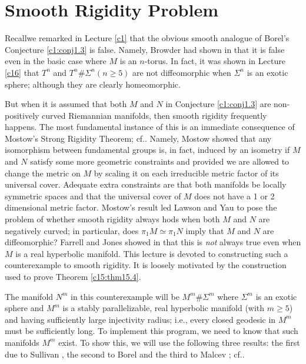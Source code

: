 \chapter{Smooth Rigidity Problem}\label{c17}

Recall\pageoriginale we remarked in Lecture \ref{c1} that the obvious
smooth analogue of Borel's Conjecture \ref{c1:conj1.3} is false. Namely, Browder
had shown in \cite{13} that it is false even in the basic case where
$M$ is an $n$-torus. In fact, it was shown in Lecture \ref{c16} that
$T^{n}$ and $T^{n}\# \Sigma^{n}(n\geq 5)$ are not diffeomorphic when
$\Sigma^{n}$ is an exotic sphere; although they are clearly
homeomorphic. 

But when it is assumed that both $M$ and $N$ in Conjecture
\ref{c1:conj1.3} are non-positively curved Riemannian manifolds, then
smooth rigidity frequently happens. The most fundamental instance of
this is an immediate consequence of Mostow's Strong Rigidity Theorem;
cf.\@ \cite{75}. Namely, Mostow showed that any isomorphism between
fundamental groups is, in fact, induced by an isometry if $M$ and $N$
satisfy some more geometric constraints and provided we are allowed to
change the metric on $M$ by scaling it on each irreducible metric
factor of its universal cover. Adequate extra constraints are that
both manifolds be locally symmetric spaces and that the universal
cover of $M$ does not have a 1 or 2 dimensional metric
factor. Mostow's result led Lawson and Yau \cite[p. 673, Problem
  12]{99} to pose the problem of whether smooth rigidity always hods
when both $M$ and $N$ are negatively curved; in particular, does
$\pi_{1}M\simeq \pi_{1}N$ imply that $M$ and $N$ are diffeomorphic?
Farrell and Jones showed in \cite{39} that this is {\em not} always
true even when $M$ is a real hyperbolic manifold. This lecture is
devoted to constructing such a counterexample to smooth rigidity. It
is loosely motivated by the construction used to prove Theorem
\ref{c15:thm15.4}. 

The manifold $N^{m}$ in this counterexample will be $M^{m}\#
\Sigma^{m}$ where $\Sigma^{m}$ is an exotic sphere and $M^{m}$ is a
stably parallelizable, real hyperbolic manifold (with $m\geq 5$) and
having sufficiently large injectivity radius; i.e., every closed
geodesic in $M^{m}$ must be sufficiently long. To implement this
program, we need to know that such manifolds $M^{m}$ exist. To show
this, we will use the following three results: the first due to
Sullivan \cite{94}, the second to Borel \cite{9} and the third to
Malcev \cite{71}; cf.\@ \cite{68}.


